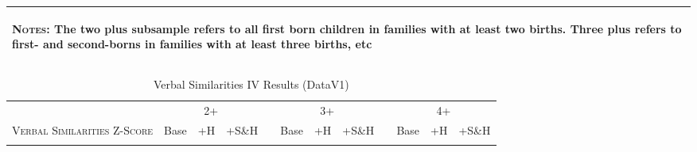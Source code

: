 \begin{landscape}
\begin{table}[htpb!]
\begin{center}
\begin{tabular}{lcccp{2mm}cccp{2mm}ccc}
\midrule\multicolumn{12}{p{19.2cm}}{\begin{footnotesize}\textsc{Notes:} The two plus subsample refers to all first born children in families with at least two births.  Three plus refers to first- and second-borns in families with at least three births, etc\end{footnotesize}} \\ \bottomrule 
\end{tabular}\end{center}\end{table}\end{landscape}\begin{landscape}\begin{table}[htpb!]\caption{Verbal Similarities IV Results (DataV1)}
\label{TWINtab:IVAll}
\begin{center}\begin{tabular}{lcccp{2mm}cccp{2mm}ccc}
\toprule \toprule 
&\multicolumn{3}{c}{2+}&&\multicolumn{3}{c}{3+}&&\multicolumn{3}{c}{4+}\\ \cmidrule(r){2-4} \cmidrule(r){6-8} \cmidrule(r){10-12} 
\textsc{Verbal Similarities Z-Score}&Base&+H&+S\&H&&Base&+H&+S\&H&&Base&+H&+S\&H\\ \midrule 
\begin{footnotesize}\end{footnotesize}& 
\begin{footnotesize}\end{footnotesize}& 
\begin{footnotesize}\end{footnotesize}& 
\begin{footnotesize}\end{footnotesize}& 
\begin{footnotesize}\end{footnotesize}& 
\begin{footnotesize}\end{footnotesize}& 
\begin{footnotesize}\end{footnotesize}& 
\begin{footnotesize}\end{footnotesize}& 
\begin{footnotesize}\end{footnotesize}& 
\begin{footnotesize}\end{footnotesize}& 
\begin{footnotesize}\end{footnotesize}& 

\end{tabular}
\end{center}
\end{table}
\end{landscape}

